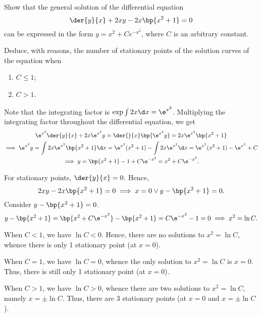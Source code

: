 \begin{problem}
    Show that the general solution of the differential equation \[\der{y}{x} + 2xy - 2x \bp{x^2 + 1} = 0\] can be expressed in the form $y = x^2 + Ce^{-x^2}$, where $C$ is an arbitrary constant.
        
    Deduce, with reasons, the number of stationary points of the solution curves of the equation when
    \begin{enumerate}
        \item $C \leq 1$;
        \item $C > 1$.
    \end{enumerate}
\end{problem}
\begin{solution}
    Note that the integrating factor is $\exp{ \int 2x \d x} = \e^{x^2}$. Multiplying the integrating factor throughout the differential equation, we get
    \begin{gather*}
        \e^{x^2}\der{y}{x} + 2x\e^{x^2}y = \der{}{x} \bp{\e^{x^2} y} = 2x\e^{x^2} \bp{x^2 + 1} \\
        \implies \e^{x^2} y = \int 2x\e^{x^2} \bp{x^2 + 1} \d x = \e^{x^2}(x^2 + 1) - \int 2x \e^{x^2} \d x = \e^{x^2} (x^2 + 1) - \e^{x^2} + C\\
        \implies y = \bp{x^2 + 1} - 1 + C\e^{-x^2} = x^2 + C\e^{-x^2}.
    \end{gather*}

    For stationary points, $\der{y}{x} = 0$. Hence, \[2xy - 2x\bp{x^2 + 1} = 0 \implies x = 0 \lor y - \bp{x^2 + 1} = 0.\] Consider $y - \bp{x^2 + 1} = 0$. \[y - \bp{x^2 + 1} = \bp{x^2 + C\e^{-x^2}} - \bp{x^2 + 1} = C\e^{-x^2} - 1 = 0 \implies x^2 = \ln C.\]

    \begin{ppart}
        When $C < 1$, we have $\ln C < 0$. Hence, there are no solutions to $x^2 = \ln C$, whence there is only 1 stationary point (at $x = 0$).

        When $C = 1$, we have $\ln C = 0$, whence the only solution to $x^2 = \ln C$ is $x = 0$. Thus, there is still only 1 stationary point (at $x = 0$).
    \end{ppart}
    \begin{ppart}
        When $C > 1$, we have $\ln C > 0$, whence there are two solutions to $x^2 = \ln C$, namely $x = \pm \ln C$. Thus, there are 3 stationary points (at $x = 0$ and $x = \pm \ln C$).
    \end{ppart}
\end{solution}


